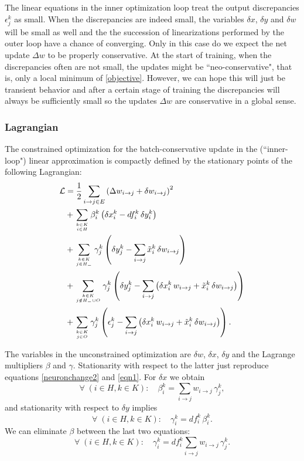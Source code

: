 \documentclass[12pt]{article}
\begin{document}
The linear equations in the inner optimization loop treat the output discrepancies $\epsilon^k_j$ as small. When the discrepancies are indeed small, the variables $\delta x$, $\delta y$ and $\delta w$ will be small as well and the the succession of linearizations performed by the outer loop have a chance of converging. Only in this case do we expect the net update $\Delta w$ to be properly conservative. At the start of training, when the discrepancies often are not small, the updates might be ``neo-conservative", that is, only a local minimum of \eqref{objective}. However, we can hope this will just be transient behavior and after a certain stage of training the discrepancies will always be sufficiently small so the updates $\Delta w$ are conservative in a global sense.


\subsubsection*{Lagrangian}

The constrained optimization for the batch-conservative update in the (``inner-loop") linear approximation is compactly defined by the stationary points of the following Lagrangian:
\begin{subequations}\label{lagrangian}
\begin{align}
\mathcal{L}&=\frac{1}{2}\sum_{i\to j\in E}\left(\Delta w_{i\to j}+\delta w_{i\to j}\right)^2\\
&+\sum_{{k\in K}\atop{i\in H}}\beta^k_i\left(\delta x^k_i-df^k_i\, \delta y^k_i\right)\\
&+\sum_{{k\in K}\atop{j\in H_-}}\gamma^k_j\left(\delta y^k_j-\sum_{i\to j}\tilde{x}^k_i\,\delta w_{i\to j}\right)\\
&+\sum_{{k\in K}\atop{j\notin H_-\cup O}}\gamma^k_j\left(\delta y^k_j-\sum_{i\to j}\left(\delta x^k_i\,w_{i\to j}+\tilde{x}^k_i\,\delta w_{i\to j}\right)\right)\\
&+\sum_{{k\in K}\atop{j\in O}}\gamma^k_j\left(\epsilon^k_j-\sum_{i\to j}\left(\delta x^k_i\,w_{i\to j}+\tilde{x}^k_i\,\delta w_{i\to j}\right)\right).\label{L5}
\end{align}
\end{subequations}

The variables in the unconstrained optimization are $\delta w$, $\delta x$, $\delta y$ and the Lagrange multipliers $\beta$ and $\gamma$. Stationarity with respect to the latter just reproduce equations \eqref{neuronchange2} and \eqref{eqn1}. For $\delta x$ we obtain
\begin{equation}
\forall\; (i\in H, k\in K):\quad \beta^k_i=\sum_{i\to j}w_{i\to j}\,\gamma^k_j,
\end{equation}
and stationarity with respect to $\delta y$ implies
\begin{equation}\label{ddeltay}
\forall\; (i\in H, k\in K):\quad \gamma^k_i=df^k_i\,\beta^k_i.
\end{equation}
We can eliminate $\beta$ between the last two equations:
\begin{equation}\label{backprop}
\forall\; (i\in H, k\in K):\quad \gamma^k_i=df^k_i\sum_{i\to j} w_{i\to j}\,\gamma^k_j.
\end{equation}
\end{document}

